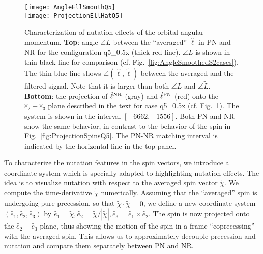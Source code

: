\documentclass[aps,prd,amsmath,floatfix,twocolumn,superscriptaddress,nofootinbib,showpacs]{revtex4-1}
\newcommand{\ellHat}{\ensuremath{\hat{\ell}}}
\begin{document}
\begin{figure}
  \texttt{[image: AngleEllSmoothQ5]} \\[10pt]
  \texttt{[image: ProjectionEllHatQ5]}
  \caption{ \label{fig:ProjectionEllHatQ5} Characterization of
    nutation effects of the orbital angular momentum.  {\bf Top}:
    angle $\angle \tilde{L}$ between the ``averaged'' $\ellHat$ in PN
    and NR for the configuration q5\_0.5x (thick red line).  $\angle
    L$ is shown in thin black line for comparison (cf.
    Fig.~\ref{fig:AngleSmoothedS2cases}). The thin blue line shows
    $\angle (\ellHat,\tilde{\ell})$ between the averaged and the
    filtered signal. Note that it is larger than both $\angle L$ and
    $\angle \tilde{L}$.  {\bf Bottom}: the projection of $\ellHat^{\rm
      NR}$ (gray) and $\ellHat^{\rm PN}$ (red) onto the
    $\hat{e}_{2}-\hat{e}_{3}$ plane described in the text for case
    q5\_0.5x (cf. Fig.~\ref{fig:ProjectionEllHatQ5}).  The system is
    shown in the interval $[-6662,-1556]$. Both PN and NR show the
    same behavior, in contrast to the behavior of the spin in
    Fig.~\ref{fig:ProjectionSpinsQ5}. The PN-NR matching interval is
    indicated by the horizontal line in the top panel. }
\end{figure}

To characterize the nutation features in the spin vectors, we
introduce a coordinate system which is specially adapted to
highlighting nutation effects.  The idea is to visualize nutation with
respect to the averaged spin vector $\tilde\chi$.  We compute the
time-derivative $\dot{\tilde{\chi}}$ numerically.  Assuming that the
``averaged'' spin is undergoing pure precession, so that
$\tilde{\chi}\cdot\dot{\tilde{\chi}} = 0$, we define a new coordinate
system $(\hat{e}_{1},\hat{e}_{2},\hat{e}_{3})$ by
$\hat{e}_{1}=\tilde{\chi},\hat{e}_{2}=\dot{\tilde{\chi}}/|\dot{\tilde{\chi}}|,
\hat{e}_{3} = \hat{e}_1\times \hat{e}_{2} $.  The spin is now
projected onto the $\hat{e}_{2}-\hat{e}_{3}$ plane, thus showing the
motion of the spin in a frame ``coprecessing'' with the averaged
spin. This allows us to approximately decouple precession and nutation
and compare them separately between PN and NR.
\end{document}
